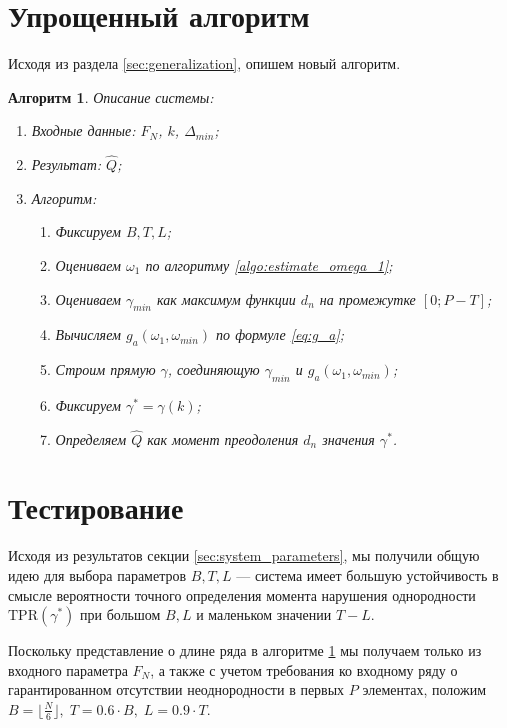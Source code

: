 \documentclass[specialist, substylefile = spbu.rtx,
			   subf, href, 12pt]{disser}
\newtheorem{algorithm}{Алгоритм}
\begin{document}
\section{Упрощенный алгоритм}
Исходя из раздела \ref{sec:generalization}, опишем новый алгоритм.
\begin{algorithm}\label{algo:system_simplification}
	Описание системы:
	\begin{enumerate}
		\item Входные данные: $ F_N $, $ k $, $ \Delta_{min} $;
		\item Результат: $ \hat{Q}$;
		\item Алгоритм:
		\begin{enumerate}
			\item Фиксируем $ B, T, L $;
			\item Оцениваем $ \omega_1 $ по алгоритму \ref{algo:estimate_omega_1};
			\item Оцениваем $ \gamma_{min} $ как максимум функции $ d_n $ на промежутке $ [0; P - T] $;
			\item Вычисляем $ g_a(\omega_1, \omega_{min}) $ по формуле \eqref{eq:g_a};
			\item Строим прямую $ \gamma $, соединяющую $ \gamma_{min} $ и $ g_a(\omega_1, \omega_{min}) $;
			\item Фиксируем $ \gamma^* = \gamma(k) $;
			\item Определяем $ \hat{Q} $ как момент преодоления $ d_n $ значения $ \gamma^* $.
		\end{enumerate}
	\end{enumerate}
\end{algorithm}


\section{Тестирование}
Исходя из результатов секции \ref{sec:system_parameters}, мы получили общую идею для выбора параметров $ B, T, L $ --- система имеет большую устойчивость в смысле вероятности точного определения момента нарушения однородности $ \mathrm{TPR}(\gamma^*) $ при большом $ B, L $ и маленьком значении $ T - L $. 

Поскольку представление о длине ряда в алгоритме \ref{algo:system_simplification} мы получаем только из входного параметра $ F_N $, а также с учетом требования ко входному ряду о гарантированном отсутствии неоднородности в первых $ P $ элементах, положим $ B = \lfloor \frac{N}{6} \rfloor,\; T = 0.6 \cdot B,\; L = 0.9 \cdot T $.
\end{document}
